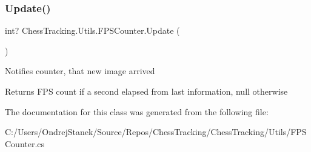 \subsubsection{\texorpdfstring{Update()}{Update()}}
{\footnotesize\ttfamily int? Chess\+Tracking.\+Utils.\+F\+P\+S\+Counter.\+Update (\begin{DoxyParamCaption}{ }\end{DoxyParamCaption})}



Notifies counter, that new image arrived 

\begin{DoxyReturn}{Returns}
F\+PS count if a second elapsed from last information, null otherwise
\end{DoxyReturn}


The documentation for this class was generated from the following file\+:\begin{DoxyCompactItemize}
\item 
C\+:/\+Users/\+Ondrej\+Stanek/\+Source/\+Repos/\+Chess\+Tracking/\+Chess\+Tracking/\+Utils/F\+P\+S\+Counter.\+cs\end{DoxyCompactItemize}
